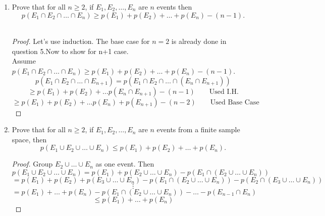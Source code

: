 \documentclass[12pt]{letter}
\begin{document}
\begin{enumerate}
\begin{proof}
	Rearrange the inequality to be \[1\geq p(E) + p(F) - p(E\cap F)\]
	\[1\geq p(E\cup F)\]
	which is true since probabilities are between 0 and 1. The inequality is an equality when $p(E\cup F)$ is certain to happen.
\end{proof}

\medskip

\item Prove that for all $n \geq 2$, if $E_1, E_2, \ldots, E_n$ are $n$ events then \[p(E_1 \cap E_2 \cap \ldots \cap E_n) \geq p(E_1) + p(E_2) + \ldots + p(E_n) - (n-1).\]\\
\begin{proof}
	Let's use induction. The base case for $n=2$ is already done in question 5.Now to show for n+1 case.\\
	Assume $p(E_1\cap E_2\cap\ldots\cap E_n)\geq p(E_1)+p(E_2)+\ldots+p(E_n)-(n-1)$.
	\[p(E_1\cap E_2\cap\ldots\cap E_{n+1}) = p(E_1\cap E_2\cap\ldots\cap (E_n\cap E_{n+1}))\]
	\[\geq p(E_1)+p(E_2)+\ldots p(E_n\cap E_{n+1})-(n-1) \qquad\text{Used I.H.}\] 
	\[\geq p(E_1)+p(E_2)+\ldots p(E_n)+p(E_{n+1})-(n-2)\qquad\text{Used Base Case}\] 
\end{proof}


\medskip


\item Prove that for all $n \geq 2$, if $E_1, E_2, \ldots, E_n$ are $n$ events from a finite sample space, then \[p(E_1 \cup E_2 \cup \ldots \cup E_n) \leq p(E_1) + p(E_2) + \ldots + p(E_n).\]
\begin{proof}
	Group $E_2 \cup \ldots \cup E_n$ as one event. Then \[p(E_1 \cup E_2 \cup \ldots \cup E_n) = p(E_1) + p(E_2 \cup \ldots \cup E_n) - p(E_1 \cap (E_2 \cup \ldots\cup E_n))\]
	\[= p(E_1)+p(E_2)+p(E_3\cup\ldots\cup E_n) - p(E_1 \cap (E_2 \cup \ldots\cup E_n))-p(E_2 \cap (E_3 \cup \ldots\cup E_n))\]
	\[\vdots\]
	\[= p(E_1)+\ldots+p(E_n) -p(E_1\cap(E_2\cup\ldots\cup E_n))-\ldots -p(E_{n-1}\cap E_n) \]
	\[\leq p(E_1)+\ldots +p(E_n)\]
\end{proof}



\end{enumerate}
\end{document}

